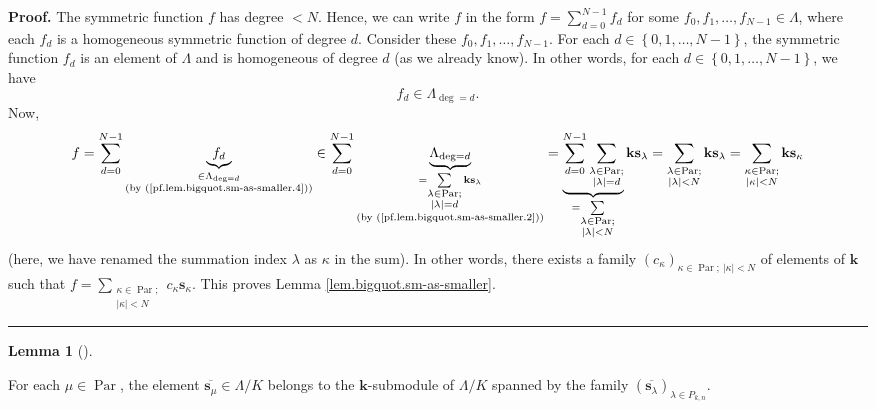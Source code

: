 \documentclass[numbers=enddot,12pt,final,onecolumn,notitlepage]{scrartcl}%
\theoremstyle{definition}
\newtheorem{lem}[theo]{Lemma}
\newenvironment{lemma}[1][]
{\begin{lem}[#1]\begin{leftbar}}
{\end{leftbar}\end{lem}}
\newenvironment{proof}[1][Proof]{\noindent\textbf{#1.} }{\ \rule{0.5em}{0.5em}}
\let\sumnonlimits\sum
\renewcommand{\sum}{\sumnonlimits\limits}
\begin{document}
\begin{proof}
The symmetric function $f$ has degree $<N$. Hence, we can write $f$ in the
form $f=\sum_{d=0}^{N-1}f_{d}$ for some $f_{0},f_{1},\ldots,f_{N-1}\in\Lambda
$, where each $f_{d}$ is a homogeneous symmetric function of degree $d$.
Consider these $f_{0},f_{1},\ldots,f_{N-1}$. For each $d\in\left\{
0,1,\ldots,N-1\right\}  $, the symmetric function $f_{d}$ is an element of
$\Lambda$ and is homogeneous of degree $d$ (as we already know). In other
words, for each $d\in\left\{  0,1,\ldots,N-1\right\}  $, we have%
\begin{equation}
f_{d}\in\Lambda_{\deg=d}. \label{pf.lem.bigquot.sm-as-smaller.4}%
\end{equation}
Now,
\[
f=\sum_{d=0}^{N-1}\underbrace{f_{d}}_{\substack{\in\Lambda_{\deg=d}\\\text{(by
(\ref{pf.lem.bigquot.sm-as-smaller.4}))}}}\in\sum_{d=0}^{N-1}%
\underbrace{\Lambda_{\deg=d}}_{\substack{=\sum_{\substack{\lambda
\in\operatorname*{Par};\\\left\vert \lambda\right\vert =d}}\mathbf{ks}%
_{\lambda}\\\text{(by (\ref{pf.lem.bigquot.sm-as-smaller.2}))}}%
}=\underbrace{\sum_{d=0}^{N-1}\sum_{\substack{\lambda\in\operatorname*{Par}%
;\\\left\vert \lambda\right\vert =d}}}_{=\sum_{\substack{\lambda
\in\operatorname*{Par};\\\left\vert \lambda\right\vert <N}}}\mathbf{ks}%
_{\lambda}=\sum_{\substack{\lambda\in\operatorname*{Par};\\\left\vert
\lambda\right\vert <N}}\mathbf{ks}_{\lambda}=\sum_{\substack{\kappa
\in\operatorname*{Par};\\\left\vert \kappa\right\vert <N}}\mathbf{ks}_{\kappa}%
\]
(here, we have renamed the summation index $\lambda$ as $\kappa$ in the sum).
In other words, there exists a family $\left(  c_{\kappa}\right)  _{\kappa
\in\operatorname*{Par};\ \left\vert \kappa\right\vert <N}$ of elements of
$\mathbf{k}$ such that $f=\sum_{\substack{\kappa\in\operatorname*{Par}%
;\\\left\vert \kappa\right\vert <N}}c_{\kappa}\mathbf{s}_{\kappa}$. This
proves Lemma \ref{lem.bigquot.sm-as-smaller}.
\end{proof}

\begin{lemma}
\label{lem.bigquot.sl-red2}For each $\mu\in\operatorname*{Par}$, the element
$\overline{\mathbf{s}_{\mu}}\in\Lambda/K$ belongs to the $\mathbf{k}%
$-submodule of $\Lambda/K$ spanned by the family $\left(  \overline
{\mathbf{s}_{\lambda}}\right)  _{\lambda\in P_{k,n}}$.
\end{lemma}
\end{document}

